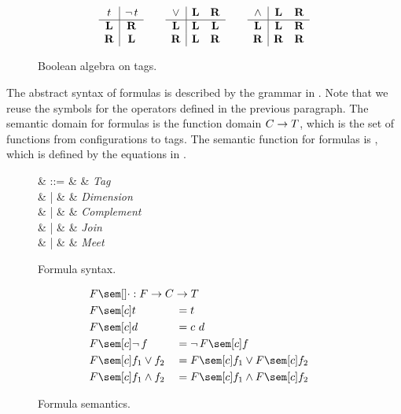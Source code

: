 \begin{figure}[H]
  \onehalfspacing
  $$
    \begin{array}{c|c}
      \color{black}t & \operatorname{\lnot} \color{black}t \\
      \hline
      \color{black}\mathbf{L} & \color{black}\mathbf{R} \\
      \color{black}\mathbf{R} & \color{black}\mathbf{L} \\
    \end{array}
    \qquad
    \begin{array}{c|cc}
      \lor & \color{black}\mathbf{L} & \color{black}\mathbf{R} \\
      \hline
      \color{black}\mathbf{L} & \color{black}\mathbf{L} & \color{black}\mathbf{L} \\
      \color{black}\mathbf{R} & \color{black}\mathbf{L} & \color{black}\mathbf{R} \\
    \end{array}
    \qquad
    \begin{array}{c|cc}
      \land & \color{black}\mathbf{L} & \color{black}\mathbf{R} \\
      \hline
      \color{black}\mathbf{L} & \color{black}\mathbf{L} & \color{black}\mathbf{R} \\
      \color{black}\mathbf{R} & \color{black}\mathbf{R} & \color{black}\mathbf{R} \\
    \end{array}
  $$
  \caption{Boolean algebra on tags.}
  \label{fig:tag}
\end{figure}

The abstract syntax of formulas is described by the grammar in .
Note that we reuse the symbols for the operators defined in the previous paragraph.
The semantic domain for formulas is the function domain $\color{black}C \to \color{black}T$, which is the set of functions from configurations to tags.
The semantic function for formulas is \fSem{\cdot}, which is defined by the equations in .

\begin{figure}[H]
  \onehalfspacing
  \begin{syntax}
    \fE \in \fS
    & ::= & \tagE & \textit{Tag} \\
    & | & \dE & \textit{Dimension} \\
    & | & \Not \fE & \textit{Complement} \\
    & | & \fE \lor \fE & \textit{Join} \\
    & | & \fE \land \fE & \textit{Meet}
  \end{syntax}
  \caption{Formula syntax.}
  \label{fig:fsyn}
\end{figure}

\begin{figure}[H]
  \onehalfspacing
  \begin{alignat*}{2}
    &\mathrlap{\fSem{\cdot} : \fS \to \cS \to \tagS} \\
    &\fSem[\cE]{\tagE} &&= \tagE \\
    &\fSem[\cE]{\dE} &&= \cE\ \dE \\
    &\fSem[\cE]{\Not \fE} &&= \Not \fSem[\cE]{\fE} \\
    &\fSem[\cE]{\fE_1 \lor \fE_2} &&=
    \fSem[\cE]{\fE_1} \lor \fSem[\cE]{\fE_2} \\
    &\fSem[\cE]{\fE_1 \land \fE_2} &&=
    \fSem[\cE]{\fE_1} \land \fSem[\cE]{\fE_2}
  \end{alignat*}
  \caption{Formula semantics.}
  \label{fig:fsem}
\end{figure}

